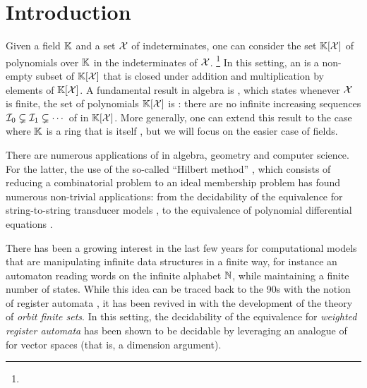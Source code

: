 \section{Introduction}
\label{sec:intro}

\AP Given a field $\mathbb{K}$ and a set $\mathcal{X}$ of indeterminates, one can consider the
set $\mathbb{K}[\mathcal{X}]$ of polynomials over $\mathbb{K}$ in the indeterminates of $\mathcal{X}$.
\footnote{}
In this setting, an  is a non-empty subset of $\mathbb{K}[\mathcal{X}]$ that is
closed under addition and multiplication by elements of $\mathbb{K}[\mathcal{X}]$. A
fundamental result in algebra is , which states
whenever $\mathcal{X}$ is finite, the set of polynomials $\mathbb{K}[\mathcal{X}]$ is
 \cite{HILB1890}: there are no infinite increasing sequences
$\idl_0 \subsetneq \idl_1 \subsetneq \cdots$ of  in $\mathbb{K}[\mathcal{X}]$.
More generally, one can extend this result to the case where $\mathbb{K}$ is a ring
that is itself , but we will focus on the easier case of fields.

\AP There are numerous applications of  in algebra,
geometry and computer science. For the latter, the use of the so-called
``Hilbert method'' \cite{BOJAN19,SCHMUDE2021}, which consists of reducing a
combinatorial problem to an ideal membership problem has found numerous
non-trivial applications: from the decidability of the equivalence for
string-to-string transducer models \cite{HONKALA00,BEDUSHWO17}, to the
equivalence of polynomial differential equations \cite{CLEMENTE24}.

\AP There has been a growing interest in the last few years for computational
models that are manipulating infinite data structures in a finite way, for
instance an automaton reading words on the infinite alphabet $\mathbb{N}$, while
maintaining a finite number of states. While this idea can be traced back to
the 90s with the notion of register automata \cite{KAFR94}, it has been revived
in with the development of the theory of \emph{orbit finite sets}. In this
setting, the decidability of the equivalence for \emph{weighted register
automata} has been shown to be decidable \cite{BOKLMO24,BOKLMO21} by leveraging
an analogue of  for vector spaces (that is, a dimension argument).

